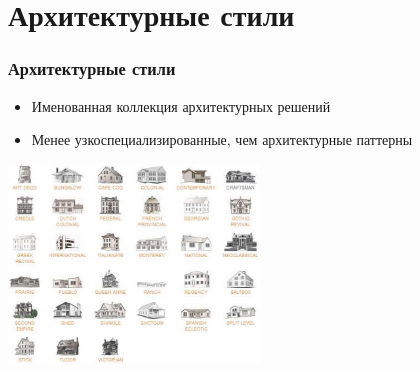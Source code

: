 \documentclass{../cscslides}
\begin{document}
    \section{Архитектурные стили}

    \begin{frame}
        \frametitle{Архитектурные стили}
        \begin{itemize}
            \item Именованная коллекция архитектурных решений
            \item Менее узкоспециализированные, чем архитектурные паттерны
        \end{itemize}
        \begin{center}
            \includegraphics[width=0.5\textwidth]{buildingStyles.png}
        \end{center}
    \end{frame}
\end{document}
